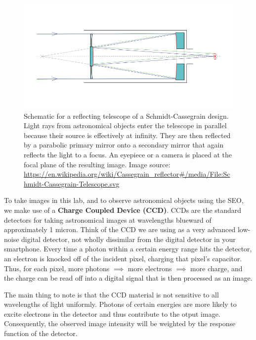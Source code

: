 \begin{figure}
	\centering
	\includegraphics[scale = 0.5]{small-optical-telescopes/Schmidt-Cassegrain-Telescope.png}
	\caption{Schematic for a reflecting telescope of a Schmidt-Cassegrain design. 
		Light rays from astronomical objects enter the telescope in parallel because their source is effectively at infinity. They are then reflected by a parabolic primary mirror onto a secondary mirror that again reflects the light to a focus. An eyepiece or a camera is placed at the focal plane of the resulting image. Image source: \url{https://en.wikipedia.org/wiki/Cassegrain\_reflector\#/media/File:Schmidt-Cassegrain-Telescope.svg}}\label{sot:fig:schmidt}
\end{figure}

To take images in this lab, and to observe astronomical objects using the SEO, we make use of a \textbf{Charge Coupled Device (CCD)}. CCDs are the standard detectors for taking astronomical images at wavelengths blueward of approximately 1 micron. Think of the CCD we are using as a
very advanced low-noise digital detector, not wholly dissimilar from the digital detector in your
smartphone. Every time a photon within a certain energy range hits the detector, an electron is knocked off of the incident pixel, charging that pixel's capacitor. Thus, for each pixel, more photons $\implies$ more electrons $\implies$ more charge, and the charge can be read off into a digital signal that is then processed as an image. 

The main thing to note is that the CCD material is not sensitive to all wavelengths of light uniformly. Photons of certain energies are more likely to excite electrons in the detector and thus contribute to the otput image. Consequently, the observed image intensity will be weighted by the response function of the detector.

